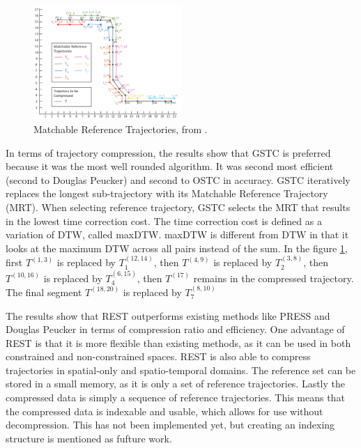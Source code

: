 \begin{figure}
    \includegraphics[width=0.5\textwidth]{./figures/rest.png}
    \caption{Matchable Reference Trajectories, from \cite{zhao2018rest}.}
    \label{fig:rest}
\end{figure}

In terms of trajectory compression, the results show that GSTC is preferred because it was the most well rounded algorithm. It was second most efficient (second to Douglas Peucker) and second to OSTC in accuracy. GSTC iteratively replaces the longest sub-trajectory with its Matchable Reference Trajectory (MRT). When selecting reference trajectory, GSTC selects the MRT that results in the lowest time correction cost. The time correction cost is defined as a variation of DTW, called maxDTW. maxDTW is different from DTW in that it looks at the maximum DTW across all pairs instead of the sum. In the figure \ref{fig:rest}, first $T^{(1,3)}$ is replaced by $T_1^{(12,14)}$, then $T^{(4,9)}$ is replaced by $T_2^{(3,8)}$, then $T^{(10,16)}$ is replaced by $T_4^{(6,15)}$, then $T^{(17)}$ remains in the compressed trajectory. The final segment $T^{(18,20)}$ is replaced by $T_7^{(8,10)}$

The results show that REST outperforms existing methods like PRESS and Douglas Peucker in terms of compression ratio and efficiency. One advantage of REST is that it is more flexible than existing methods, as it can be used in both constrained and non-constrained spaces. REST is also able to compress trajectories in spatial-only and spatio-temporal domains. The reference set can be stored in a small memory, as it is only a set of reference trajectories. Lastly the compressed data is simply a sequence of reference trajectories. This means that the compressed data is indexable and usable, which allows for use without decompression. This has not been implemented yet, but creating an indexing structure is mentioned as fufture work.

